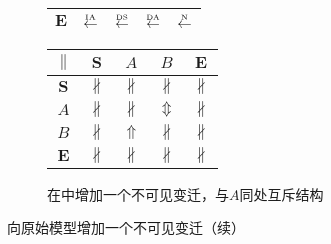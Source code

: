 \begin{figure}[htbp]
\begin{subfigure}{1\textwidth}
\begin{minipage}[b]{0.3\textwidth}
\begin{tabular}{|c|c|c|c|c|}
        $\bm{E}$ & $\overset{\text{\tiny{IA}}}{\leftarrow}$ & $\overset{\text{\tiny{DS}}}{\leftarrow}$ & $\overset{\text{\tiny{DA}}}{\leftarrow}$ & $\overset{\text{\tiny{N}}}{\leftarrow}$\\ \hline
      \end{tabular}
    \end{minipage}
    \begin{minipage}[b]{0.3\textwidth}
      \vspace{1em}
      \centering
      \begin{tabular}{|c|c|c|c|c|} \hline
        $\parallel$ & $\bm{S}$ & $A$ & $B$ & $\bm{E}$\\ \hline
        $\bm{S}$ & $\nparallel$ & $\nparallel$ & $\nparallel$ & $\nparallel$\\ \hline
        $A$ & $\nparallel$ & $\nparallel$ & $\Updownarrow$ & $\nparallel$\\ \hline
        $B$ & $\nparallel$ & $\Uparrow$ & $\nparallel$ & $\nparallel$\\ \hline
        $\bm{E}$ & $\nparallel$ & $\nparallel$ & $\nparallel$ & $\nparallel$\\ \hline
      \end{tabular}
    \end{minipage}
    \caption{在中增加一个不可见变迁，与$A$同处互斥结构}
    \label{fig:uniqueness_3_g}
  \end{subfigure}
  \vspace{6pt}
  \caption{向原始模型增加一个不可见变迁（续）}
\end{figure}

